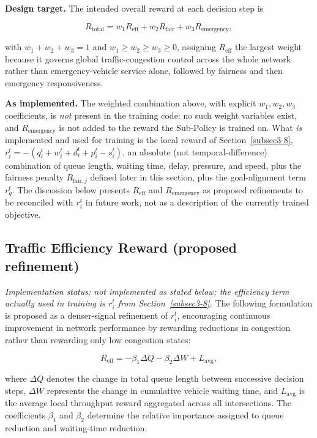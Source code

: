 \documentclass[3p,times]{elsarticle}
\theoremstyle{plain}
\theoremstyle{definition}
\begin{document}
\textbf{Design target.} The intended overall reward at each decision
step is

\begin{equation}
R_{\text{total}}
=
w_1 R_{\text{eff}}
+
w_2 R_{\text{fair}}
+
w_3 R_{\text{emergency}},
\end{equation}

with $w_1 + w_2 + w_3 = 1$ and $w_1 \ge w_2 \ge w_3 \ge 0$, assigning
$R_{\text{eff}}$ the largest weight because it governs global
traffic-congestion control across the whole network rather than
emergency-vehicle service alone, followed by fairness and then
emergency responsiveness.

\textbf{As implemented.} The weighted combination above, with explicit
$w_1,w_2,w_3$ coefficients, is \emph{not} present in the training code:
no such weight variables exist, and $R_{\text{emergency}}$ is not added
to the reward the Sub-Policy is trained on. What \emph{is} implemented
and used for training is the local reward of
Section~\ref{subsec3-8}, $r_i^t = -(q_i^t+w_i^t+d_i^t+p_i^t-s_i^t)$,
an absolute (not temporal-difference) combination of queue length,
waiting time, delay, pressure, and speed, plus the fairness penalty
$R_{\mathrm{fair},j}$ defined later in this section, plus the
goal-alignment term $r_g^t$. The discussion below presents
$R_{\text{eff}}$ and $R_{\text{emergency}}$ as proposed refinements to
be reconciled with $r_i^t$ in future work, not as a description of the
currently trained objective.

\subsection{Traffic Efficiency Reward (proposed refinement)}

\textit{Implementation status: not implemented as stated below; the
efficiency term actually used in training is $r_i^t$ from
Section~\ref{subsec3-8}.} The following formulation is proposed as a
denser-signal refinement of $r_i^t$, encouraging continuous improvement
in network performance by rewarding reductions in congestion rather
than rewarding only low congestion states:

\begin{equation}
R_{\text{eff}}
=
-\beta_1 \Delta Q
-\beta_2 \Delta W
+
L_{\text{avg}},
\end{equation}

where $\Delta Q$ denotes the change in total queue length between
successive decision steps, $\Delta W$ represents the change in
cumulative vehicle waiting time, and $L_{\text{avg}}$ is the average
local throughput reward aggregated across all intersections. The
coefficients $\beta_1$ and $\beta_2$ determine the relative importance
assigned to queue reduction and waiting-time reduction.
\end{document}
